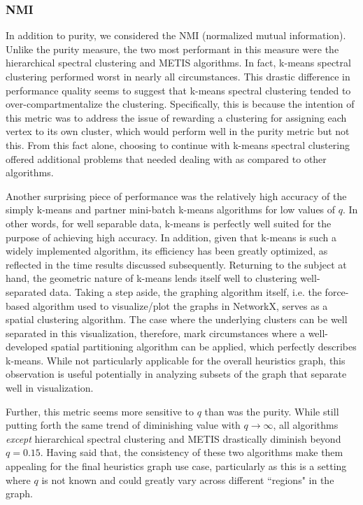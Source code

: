 \documentclass{article}
\begin{document}
\subsubsection{NMI}
In addition to purity, we considered the NMI (normalized mutual information). Unlike the purity measure, the two most performant in this measure were the hierarchical spectral clustering and METIS algorithms. In fact, k-means spectral clustering performed worst in nearly all circumstances. This drastic difference in performance quality seems to suggest that k-means spectral clustering tended to over-compartmentalize the clustering. Specifically, this is because the intention of this metric was to address the issue of rewarding a clustering for assigning each vertex to its own cluster, which would perform well in the purity metric but not this. From this fact alone, choosing to continue with k-means spectral clustering offered additional problems that needed dealing with as compared to other algorithms.

Another surprising piece of performance was the relatively high accuracy of the simply k-means and partner mini-batch k-means algorithms for low values of $q$. In other words, for well separable data, k-means is perfectly well suited for the purpose of achieving high accuracy. In addition, given that k-means is such a widely implemented algorithm, its efficiency has been greatly optimized, as reflected in the time results discussed subsequently. Returning to the subject at hand, the geometric nature of k-means lends itself well to clustering well-separated data. Taking a step aside, the graphing algorithm itself, i.e. the force-based algorithm used to visualize/plot the graphs in NetworkX, serves as a spatial clustering algorithm. The case where the underlying clusters can be well separated in this visualization, therefore, mark circumstances where a well-developed spatial partitioning algorithm can be applied, which perfectly describes k-means. While not particularly applicable for the overall heuristics graph, this observation is useful potentially in analyzing subsets of the graph that separate well in visualization.

Further, this metric seems more sensitive to $q$ than was the purity. While still putting forth the same trend of diminishing value with $q\rightarrow\infty$, all algorithms \textit{except} hierarchical spectral clustering and METIS drastically diminish beyond $q=0.15$. Having said that, the consistency of these two algorithms make them appealing for the final heuristics graph use case, particularly as this is a setting where $q$ is not known and could greatly vary across different ``regions" in the graph.
\end{document}
